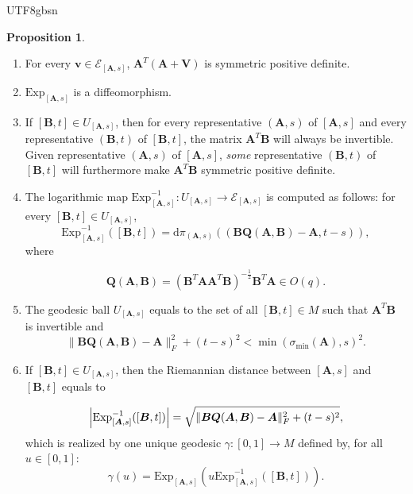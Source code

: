 \documentclass[12pt]{report}
\newcommand{\bracket}[1]{\left ( #1 \right )}
\theoremstyle{plain}
\theoremstyle{definition}
\newtheorem{proposition}[theorem]{Proposition}
\begin{document}
\begin{CJK*}{UTF8}{gbsn}
\begin{proposition}
\begin{enumerate}
  \item For every $\bm{v} \in \mathcal{E}_{[\bm{A},s]}$,
  $\bm{A}^T(\bm{A}+\bm{V})$ is symmetric positive definite.
  \item $\text{Exp}_{[\bm{A},s]}$ is a diffeomorphism.
  \item If $[\bm{B},t] \in U_{[\bm{A},s]}$, then for every representative $(\bm{A},s)$ of $[\bm{A},s]$
  and every representative $(\bm{B},t)$ of $[\bm{B},t]$, the matrix $\bm{A}^T \bm{B}$ will 
  always be invertible. Given representative $(\bm{A},s)$ of $[\bm{A},s]$,
  \textit{some} representative $(\bm{B},t)$ of $[\bm{B},t]$ will furthermore 
  make $\bm{A}^T \bm{B}$ symmetric positive definite.
  \item The logarithmic map $\text{Exp}^{-1}_{[\bm{A},s]}:U_{[\bm{A},s]} \to \mathcal{E}_{[\bm{A},s]}$
  is computed as follows:
  for every $[\bm{B},t] \in U_{[\bm{A},s]}$,
  \begin{equation}\label{eq:logarithmic_def}
    \text{Exp}^{-1}_{[\bm{A},s]}([\bm{B},t]) 
    = \mathrm{d} \pi_{(\bm{A},s)}((\bm{B}\bm{Q}(\bm{A},\bm{B})-\bm{A}, t-s)),
  \end{equation}
  where 

  \begin{equation}\label{eq:Q_A_B_def}
    \bm{Q}(\bm{A},\bm{B}) 
    = (\bm{B}^T \bm{A} \bm{A}^T \bm{B})^{- \frac{1}{2}} \bm{B}^T \bm{A} \in O(q).
  \end{equation}
  \item The geodesic ball $U_{[\bm{A},s]}$ equals to the set of all $[\bm{B},t] \in M$ such that 
  $\bm{A}^T\bm{B}$ is invertible and
  \begin{equation}\label{eq:U_A_s_def}
    \|\bm{B}\bm{Q}(\bm{A},\bm{B})-\bm{A}\|_F^2 + (t-s)^2
    < \min\bracket{\sigma_{\min}(\bm{A}),s}^2.
  \end{equation}
  \item If $[\bm{B},t] \in U_{[\bm{A},s]}$, then the Riemannian distance between 
  $[\bm{A},s]$ and $[\bm{B},t]$ equals to 

  \begin{equation}\label{eq:Riemannian_distance}
    \abs{\text{Exp}^{-1}_{[\bm{A},s]}([\bm{B},t])} = \sqrt{\|\bm{B}\bm{Q}(\bm{A},\bm{B})-\bm{A}\|_F^2 + (t-s)^2},
  \end{equation}
  which is realized by one unique geodesic $\gamma: [0,1] \to M$ defined by, for all $u \in [0,1]$:
  \begin{equation}\label{eq:dist_minimizing_curve}
    \gamma(u) = \text{Exp}_{[\bm{A},s]}(u \text{Exp}^{-1}_{[\bm{A},s]}([\bm{B},t])).
  \end{equation}
\end{enumerate}
\end{proposition}


\end{CJK*}
\end{document}
